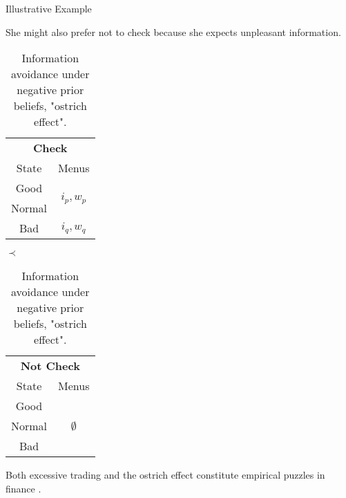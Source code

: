 \documentclass[usenames,dvipsnames,aspectratio=169,11pt, envcountsect, handout]{beamer}
\begin{document}
\begin{frame}[noframenumbering]{Illustrative Example}

	She might also prefer not to check because she expects unpleasant information.

	\vfill

	\begin{table}[H]
		\centering
		\begin{minipage}{0.29\textwidth}

		\end{minipage}\hspace{0.3cm} %
		\begin{minipage}{0.29\textwidth}
			\centering
			\begin{tabular}{c | c}
				\multicolumn{2}{c}{\textbf{Check}}                                     \\
				State                & Menus                                           \\
				\hline
				{\color{blue}Good}   & \multirow{2}{*}{{\color{blue}\( i_{p}, w_p \)}} \\
				{\color{blue}Normal} &                                                 \\
				\hline
				Bad                  & \(  i_{q}, w_q \)                               \\
			\end{tabular}
			\vspace{0.5cm} %
		\end{minipage}\hspace{0.5cm} %
		\( \prec  \)
		\begin{minipage}{0.29\textwidth}
			\centering
			\begin{tabular}{c | c}
				\multicolumn{2}{c}{\textbf{Not Check}}   \\
				State  & Menus                           \\
				\hline
				Good   & \multirow{3}{*}{ \(\emptyset\)} \\
				Normal &                                 \\
				Bad    &                                 \\
			\end{tabular}
			\vspace{0.5cm} %
		\end{minipage}
		\caption{Information avoidance under negative prior beliefs, "ostrich effect".} %
		\label{tab:oistrich}
	\end{table} \pause

	Both excessive trading and the ostrich effect constitute empirical puzzles in finance \citep{danielOverconfidentInvestorsPredictable2015,golmanInformationAvoidance2017}.

\end{frame}
\end{document}
